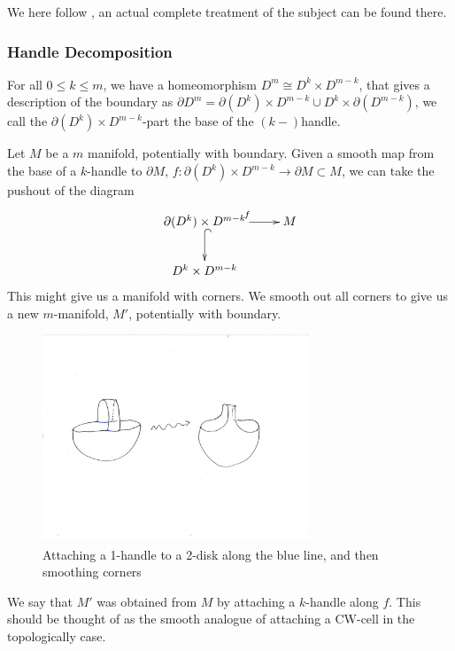 \documentclass{article}
\newtheorem{proposed work}[theorem]{Proposed Work}
\theoremstyle{definition}
\newcommand{\xymat}[1]{\begin{align*}\xymatrix{ #1}\end{align*}}
\begin{document}
We here follow \cite{milnor2016morse}, an actual complete treatment of the subject can be found there.
\subsubsection{Handle Decomposition}
For all $0\leq k \leq m$, we have a homeomorphism $D^m\cong D^k\times D^{m-k}$, that gives a description of the boundary as $\partial D^m = \partial(D^k) \times D^{m-k} \cup D^k\times \partial(D^{m-k})$, we call the $\partial(D^k) \times D^{m-k}$-part the base of the $(k-)$handle. 

Let $M$ be a $m$ manifold, potentially with boundary. Given a smooth map from the base of a $k$-handle to $\partial M$, $f:\partial(D^k) \times D^{m-k}\to \partial M\subset M$, we can take the pushout of the diagram
\xymat{\partial(D^k) \times D^{m-k} \ar[r]^f \ar@{^{(}->}[d] & M \\ D^k\times D^{m-k} &}
This might give us a manifold with corners. We smooth out all corners to give us a new $m$-manifold, $M'$, potentially with boundary. 
\begin{figure}[h]
\includegraphics[width=8cm]{attach1handle.pdf}
\caption{Attaching a 1-handle to a 2-disk along the blue line, and then smoothing corners\label{attach1handle}}
\end{figure}
We say that $M'$ was obtained from $M$ by attaching a $k$-handle along $f$. This should be thought of as the smooth analogue of attaching a CW-cell in the topologically case.
\end{document}
